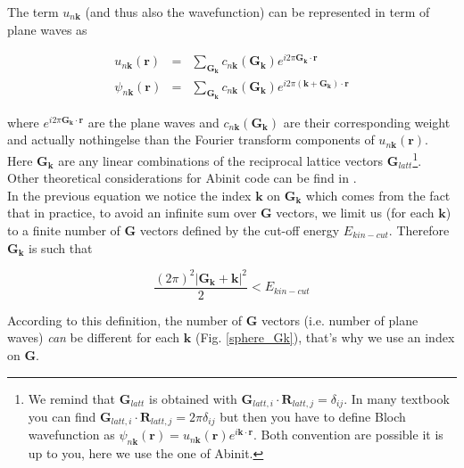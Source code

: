 \documentclass[a4paper,12pt]{report}
\begin{document}
The term $u_{n\mathbf{k}}$ (and thus also the wavefunction) can be represented in term of plane waves as

\begin{eqnarray}
u_{n\mathbf{k}}(\mathbf{r}) &=& \sum_{\mathbf{G_{\mathbf{k}}}} c_{n\mathbf{k}}(\mathbf{G}_{\mathbf{k}}) e^{i2\pi \mathbf{G}_{\mathbf{k}}\cdotp\mathbf{r}} \\
\psi_{n\mathbf{k}}(\mathbf{r}) &=& \sum_{\mathbf{G_{\mathbf{k}}}} c_{n\mathbf{k}}(\mathbf{G}_{\mathbf{k}}) e^{i2\pi \left(  \mathbf{k} +\mathbf{G}_{\mathbf{k}}\right) \cdotp\mathbf{r}}
\end{eqnarray}

where $e^{i2\pi\mathbf{G}_{\mathbf{k}}\cdotp\mathbf{r}}$ are the plane waves and $c_{n\mathbf{k}}(\mathbf{G}_{\mathbf{k}})$ are their corresponding weight and actually nothingelse than the Fourier transform components of $u_{n\mathbf{k}}(\mathbf{r})$. Here $\mathbf{G_{\mathbf{k}}}$ are any linear combinations of the reciprocal lattice vectors $\mathbf{G}_{latt}$\footnote{We remind that $\mathbf{G}_{latt}$ is obtained with $\mathbf{G}_{latt,i}\cdotp\mathbf{R}_{latt,j} = \delta_{ij}$. In many textbook you can find $\mathbf{G}_{latt,i}\cdotp\mathbf{R}_{latt,j} = 2\pi \delta_{ij}$ but then you have to define Bloch wavefunction as $\psi_{n\mathbf{k}}(\mathbf{r}) = u_{n\mathbf{k}}(\mathbf{r}) e^{i\mathbf{k}\cdotp\mathbf{r}}$. Both convention are possible it is up to you, here we use the one of Abinit.}. Other theoretical considerations  for Abinit code can be find in \cite{doc1WF_gonze}.\\
In the previous equation we notice the index $\mathbf{k}$ on $\mathbf{G_{\mathbf{k}}}$ which comes from the fact that in practice, to avoid an infinite sum over $\mathbf{G}$ vectors, we limit us (for each $\mathbf{k}$) to a finite number of $\mathbf{G}$ vectors defined by the cut-off energy $E_{kin-cut}$. Therefore $\mathbf{G}_{\mathbf{k}}$ is such that

\begin{equation}
\frac{(2\pi)^2 \vert \mathbf{G}_{\mathbf{k}}+\mathbf{k} \vert^2}{2} < E_{kin-cut} \label{Ecutsphere}
\end{equation}

According to this definition, the number of $\mathbf{G}$ vectors (i.e. number of plane waves) \textit{can} be different for each $\mathbf{k}$ (Fig. \ref{sphere_Gk}), that's why we use an index on $\mathbf{G}$.
\end{document}
